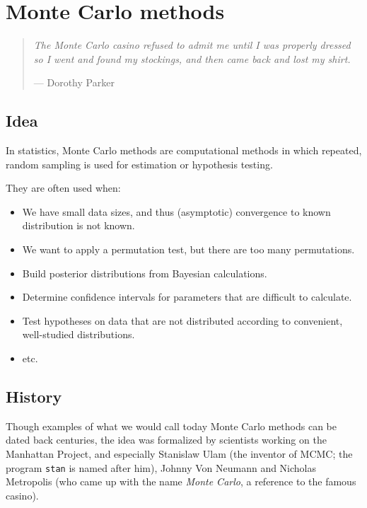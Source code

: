 \documentclass[
  letterpaper,
  DIV=11,
  numbers=noendperiod]{scrreprt}
\providecommand{\tightlist}{%
  \setlength{\itemsep}{0pt}\setlength{\parskip}{0pt}}\usepackage{longtable,booktabs,array}
\begin{document}

\chapter{Monte Carlo methods}\label{monte-carlo-methods}

\begin{quote}
\emph{The Monte Carlo casino refused to admit me until I was properly
dressed so I went and found my stockings, and then came back and lost my
shirt.}

--- Dorothy Parker
\end{quote}

\section{Idea}\label{idea}

In statistics, Monte Carlo methods are computational methods in which
repeated, random sampling is used for estimation or hypothesis testing.

They are often used when:

\begin{itemize}
\tightlist
\item
  We have small data sizes, and thus (asymptotic) convergence to known
  distribution is not known.
\item
  We want to apply a permutation test, but there are too many
  permutations.
\item
  Build posterior distributions from Bayesian calculations.
\item
  Determine confidence intervals for parameters that are difficult to
  calculate.
\item
  Test hypotheses on data that are not distributed according to
  convenient, well-studied distributions.
\item
  etc.
\end{itemize}

\section{History}\label{history}

Though examples of what we would call today Monte Carlo methods can be
dated back centuries, the idea was formalized by scientists working on
the Manhattan Project, and especially Stanislaw Ulam (the inventor of
MCMC; the program \texttt{stan} is named after him), Johnny Von Neumann
and Nicholas Metropolis (who came up with the name \emph{Monte Carlo}, a
reference to the famous casino).
\end{document}
